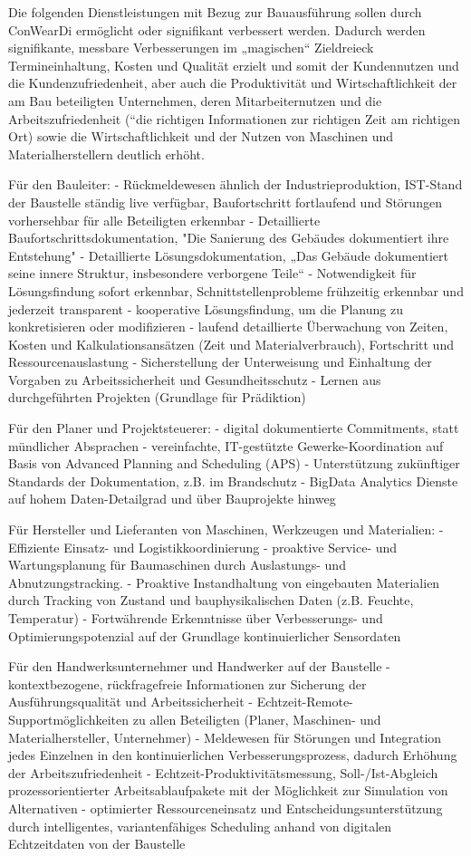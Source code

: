 Die folgenden Dienstleistungen mit Bezug zur Bauausführung sollen durch ConWearDi ermöglicht oder signifikant verbessert werden. Dadurch werden signifikante, messbare Verbesserungen im „magischen“ Zieldreieck Termineinhaltung, Kosten und Qualität erzielt und somit der  Kundennutzen und die Kundenzufriedenheit, aber auch die Produktivität und Wirtschaftlichkeit der am Bau beteiligten Unternehmen, deren Mitarbeiternutzen und die Arbeitszufriedenheit (“die richtigen Informationen zur richtigen Zeit am richtigen Ort) sowie die Wirtschaftlichkeit und der Nutzen von Maschinen und Materialherstellern deutlich erhöht.

Für den Bauleiter:
- Rückmeldewesen ähnlich der Industrieproduktion, IST-Stand der Baustelle ständig live verfügbar, Baufortschritt fortlaufend und Störungen vorhersehbar für alle Beteiligten erkennbar
- Detaillierte Baufortschrittsdokumentation, "Die Sanierung des Gebäudes dokumentiert ihre Entstehung"
- Detaillierte Lösungsdokumentation, „Das Gebäude dokumentiert seine innere Struktur, insbesondere verborgene Teile“
- Notwendigkeit für Lösungsfindung sofort erkennbar, Schnittstellenprobleme frühzeitig erkennbar und jederzeit transparent
- kooperative Lösungsfindung, um die  Planung zu  konkretisieren  oder  modifizieren 
- laufend detaillierte Überwachung von Zeiten, Kosten und Kalkulationsansätzen (Zeit und Materialverbrauch), Fortschritt und Ressourcenauslastung
- Sicherstellung der Unterweisung und Einhaltung der Vorgaben zu Arbeitssicherheit und Gesundheitsschutz
- Lernen aus durchgeführten Projekten (Grundlage für Prädiktion) 


Für den Planer und Projektsteuerer:
- digital dokumentierte Commitments, statt mündlicher Absprachen
- vereinfachte, IT-gestützte Gewerke-Koordination auf Basis von Advanced Planning and Scheduling (APS)
- Unterstützung zukünftiger Standards der Dokumentation, z.B. im Brandschutz
- BigData Analytics Dienste auf hohem Daten-Detailgrad und über Bauprojekte hinweg


Für Hersteller und Lieferanten von Maschinen, Werkzeugen und Materialien:
- Effiziente Einsatz- und Logistikkoordinierung 
- proaktive Service- und Wartungsplanung für Baumaschinen durch Auslastungs- und Abnutzungstracking.
- Proaktive Instandhaltung von eingebauten Materialien durch Tracking von Zustand und bauphysikalischen Daten (z.B. Feuchte, Temperatur) 
- Fortwährende Erkenntnisse über Verbesserungs- und Optimierungspotenzial auf der Grundlage kontinuierlicher Sensordaten


Für den Handwerksunternehmer und Handwerker auf der Baustelle
- kontextbezogene, rückfragefreie Informationen zur Sicherung der Ausführungsqualität und Arbeitssicherheit
- Echtzeit-Remote-Supportmöglichkeiten zu allen Beteiligten (Planer, Maschinen- und Materialhersteller, Unternehmer)
- Meldewesen für Störungen und Integration jedes Einzelnen in den kontinuierlichen Verbesserungsprozess, dadurch Erhöhung der Arbeitszufriedenheit
- Echtzeit-Produktivitätsmessung, Soll-/Ist-Abgleich prozessorientierter Arbeitsablaufpakete mit der Möglichkeit zur Simulation von Alternativen
- optimierter Ressourceneinsatz und Entscheidungsunterstützung durch intelligentes, variantenfähiges Scheduling anhand von digitalen Echtzeitdaten von der Baustelle


